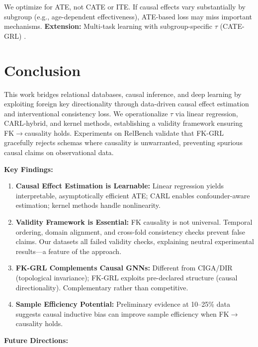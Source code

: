 \documentclass[11pt,letterpaper]{article}
\begin{document}
We optimize for ATE, not CATE or ITE. If causal effects vary substantially by subgroup (e.g., age-dependent effectiveness), ATE-based loss may miss important mechanisms. \textbf{Extension:} Multi-task learning with subgroup-specific $\tau$ (CATE-GRL) \cite{Kunzel2019}.

\section{Conclusion}

This work bridges relational databases, causal inference, and deep learning by exploiting foreign key directionality through data-driven causal effect estimation and interventional consistency loss. We operationalize $\tau$ via linear regression, CARL-hybrid, and kernel methods, establishing a validity framework ensuring FK$\rightarrow$causality holds. Experiments on RelBench validate that FK-GRL gracefully rejects schemas where causality is unwarranted, preventing spurious causal claims on observational data.

\textbf{Key Findings:}

\begin{enumerate}
\item \textbf{Causal Effect Estimation is Learnable:} Linear regression yields interpretable, asymptotically efficient ATE; CARL enables confounder-aware estimation; kernel methods handle nonlinearity.

\item \textbf{Validity Framework is Essential:} FK causality is not universal. Temporal ordering, domain alignment, and cross-fold consistency checks prevent false claims. Our datasets all failed validity checks, explaining neutral experimental results---a feature of the approach.

\item \textbf{FK-GRL Complements Causal GNNs:} Different from CIGA/DIR (topological invariance); FK-GRL exploits pre-declared structure (causal directionality). Complementary rather than competitive.

\item \textbf{Sample Efficiency Potential:} Preliminary evidence at 10--25\% data suggests causal inductive bias can improve sample efficiency when FK$\rightarrow$causality holds.
\end{enumerate}

\textbf{Future Directions:}
\end{document}
